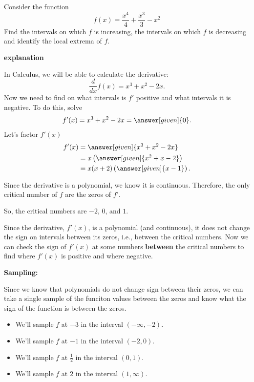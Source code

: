 \documentclass{ximera}
\begin{document}
\begin{example}


Consider the function 
\[
f(x) = \frac{x^4}{4}+\frac{x^3}{3}-x^2
\]
Find the intervals on which $f$ is increasing, the intervals on which $f$ is decreasing and
identify the local extrema of $f$.


\textbf{\textcolor{red!75!green}{explanation}} 

In Calculus, we will be able to calculate the derivative:
\[
\frac{d}{dx} f(x) = x^3+x^2-2x.
\]
Now we need to find on what intervals is $f'$ positive and what intervals it is
negative. To do this, solve 
\[
f'(x) = x^3+x^2-2x = \answer[given]{0}.
\]
Let's factor $f'(x)$
\begin{align*}
f'(x) &= \answer[given]{x^3+x^2-2x} \\
&=x\left(\answer[given]{x^2+x-2}\right)\\
&=x(x+2)\left(\answer[given]{x-1}\right).
\end{align*}


Since the derivative is a polynomial, we know it is continuous.  Therefore, the only critical number of $f$ are the zeros of $f'$.


So, the critical numbers are  $-2$, $0$, and $1$. 



Since the derivative, $f'(x)$, is a polynomial (and continuous), it does not change the sign on intervals between its zeros, i.e., between the critical numbers. Now we can check the sign of $f'(x)$ at some numbers \textbf{between} the critical numbers to find where $f'(x)$ is positive and where negative.




\textbf{Sampling: } 


Since we know that polynomials do not change sign between their zeros, we can take a single sample of the funciton values between the zeros and know what the sign of the function is between the zeros. \\



\begin{itemize}
\item We'll sample $f$ at $-3$ in the interval $(-\infty, -2)$. \\
\item We'll sample $f$ at $-1$ in the interval $(-2, 0)$. \\
\item We'll sample $f$ at $\frac{1}{2}$ in the interval $(0, 1)$. \\
\item We'll sample $f$ at $2$ in the interval $(1, \infty)$. \\
\end{itemize}




\end{example}
\end{document}

